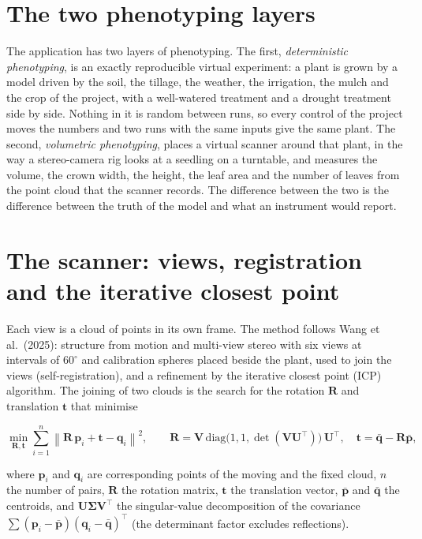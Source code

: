\section{The two phenotyping layers}
The application has two layers of phenotyping. The first, \emph{deterministic phenotyping}, is an exactly reproducible virtual experiment: a plant is grown by a model driven by the soil, the tillage, the weather, the irrigation, the mulch and the crop of the project, with a well-watered treatment and a drought treatment side by side. Nothing in it is random between runs, so every control of the project moves the numbers and two runs with the same inputs give the same plant. The second, \emph{volumetric phenotyping}, places a virtual scanner around that plant, in the way a stereo-camera rig looks at a seedling on a turntable, and measures the volume, the crown width, the height, the leaf area and the number of leaves from the point cloud that the scanner records. The difference between the two is the difference between the truth of the model and what an instrument would report.

\section{The scanner: views, registration and the iterative closest point}
Each view is a cloud of points in its own frame. The method follows Wang et al.\ (2025): structure from motion and multi-view stereo with six views at intervals of $60^\circ$ and calibration spheres placed beside the plant, used to join the views (self-registration), and a refinement by the iterative closest point (ICP) algorithm. The joining of two clouds is the search for the rotation $\mathbf R$ and translation $\mathbf t$ that minimise

\begin{equation}\min_{\mathbf R,\mathbf t}\sum_{i=1}^{n}\left\|\mathbf R\,\mathbf p_i+\mathbf t-\mathbf q_i\right\|^{2},\qquad \mathbf R=\mathbf V\,\mathrm{diag}\bigl(1,1,\det(\mathbf V\mathbf U^{\!\top})\bigr)\,\mathbf U^{\!\top},\quad \mathbf t=\bar{\mathbf q}-\mathbf R\bar{\mathbf p},\label{eq:ph-icp}\end{equation}
\par\noindent where $\mathbf p_i$ and $\mathbf q_i$ are corresponding points of the moving and the fixed cloud, $n$ the number of pairs, $\mathbf R$ the rotation matrix, $\mathbf t$ the translation vector, $\bar{\mathbf p}$ and $\bar{\mathbf q}$ the centroids, and $\mathbf U\boldsymbol\Sigma\mathbf V^{\!\top}$ the singular-value decomposition of the covariance $\sum(\mathbf p_i-\bar{\mathbf p})(\mathbf q_i-\bar{\mathbf q})^{\!\top}$ (the determinant factor excludes reflections).



